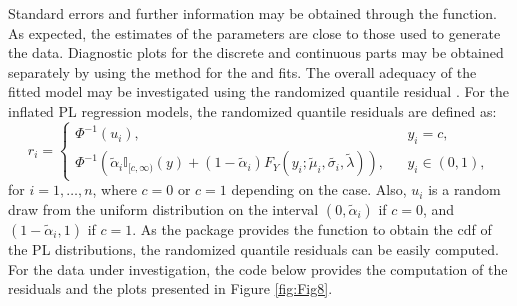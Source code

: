 Standard errors and further information may be obtained through the  function. As expected, the estimates of the parameters are close to those used to generate the data. Diagnostic plots for the discrete and continuous parts may be obtained separately by using the  method for the  and  fits. The overall adequacy of the fitted model may be investigated using the randomized quantile residual \citep{DunnSmyth}. For the inflated PL regression models, the randomized quantile residuals are defined as:
\begin{equation*} 
r_i = \left\{
\begin{array}{rcl}
\Phi ^{-1} (u_i), & & y_i = c,\\
\Phi ^{-1}\left(\widetilde{\alpha}_i \mathbb{I}_{[c,\infty)}(y) + (1- \widetilde{\alpha}_i) F_Y(y_i; \widetilde{\mu}_i, \widetilde{\sigma_i}, \widetilde{\lambda})\right) ,& & y_i \in (0,1),
\end{array}
\right.
\end{equation*}
for $i=1, \ldots, n$, where $c = 0$ or $c=1$ depending on the case. Also, $u_i$ is a random draw from the uniform distribution on the interval $(0, \widetilde{\alpha}_i)$ if $c=0$, and $(1-\widetilde{\alpha}_i, 1)$ if $c=1$. As the  package provides the  function to obtain the cdf of the PL distributions, the randomized quantile residuals can be easily computed. For the data under investigation, the code below provides the computation of the residuals and the plots presented in Figure \ref{fig:Fig8}.
\begin{Schunk}
\end{Schunk}
